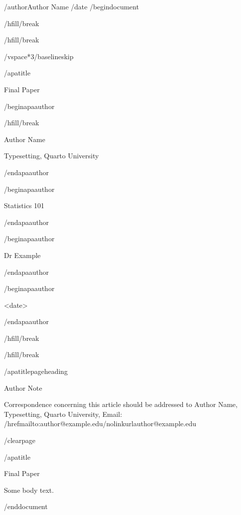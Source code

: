 /author{Author Name}
/date{}
/begin{document}


/hfill/break

/hfill/break

/vspace*{3/baselineskip}

/apatitle{

Final Paper

}

/begin{apaauthor}

/hfill/break

Author Name

Typesetting, Quarto University

/end{apaauthor}

/begin{apaauthor}

Statistics 101

/end{apaauthor}

/begin{apaauthor}

Dr Example

/end{apaauthor}

/begin{apaauthor}

<date>

/end{apaauthor}

/hfill/break

/hfill/break

/apatitlepageheading{

Author Note

}

Correspondence concerning this article should be addressed to Author
Name, Typesetting, Quarto University, Email:
/href{mailto:author@example.edu}{/nolinkurl{author@example.edu}}

/clearpage

/apatitle{

Final Paper

}

Some body text.




/end{document}
